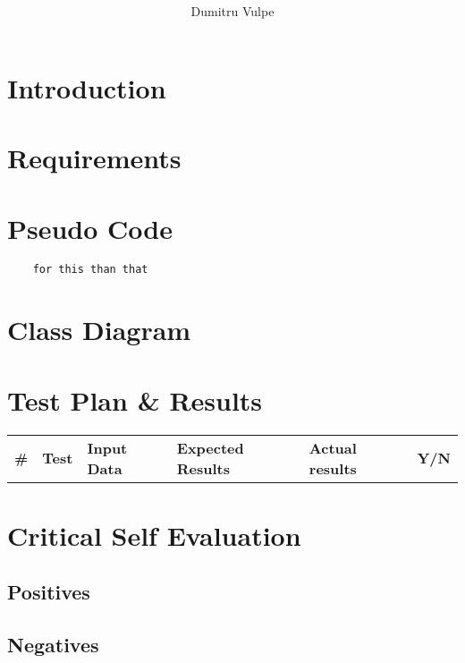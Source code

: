 \documentclass[]{report}
\title{ }
\author{Dumitru Vulpe}
\begin{document}
	\maketitle
	\tableofcontents
	\newpage
	\section{Introduction}
	
	\newpage
	\section{Requirements}
	\begin{enumerate}
		
	\end{enumerate}
	
	\newpage
	\section{Pseudo Code}
	\begin{lstlisting}
	for this than that
	\end{lstlisting}
	\newpage
	\section{Class Diagram}
	
	\newpage
	\section{Test Plan \& Results}
	\begin{center}
		\begin{tabular}{|p{0.2cm}|p{2.6cm}|p{4cm}|p{4cm}|p{1.3cm}|p{0.7cm}|}
			\hline
			{\bf \#} & {\bf Test} & {\bf Input Data} & {\bf Expected Results} & {\bf Actual results} & {\bf Y/N} \\
			
		\end{tabular}  
	\end{center}
	\newpage
	\section{Critical Self Evaluation}
	
	\subsection{Positives}

	\subsection{Negatives}
	
	
\end{document}
